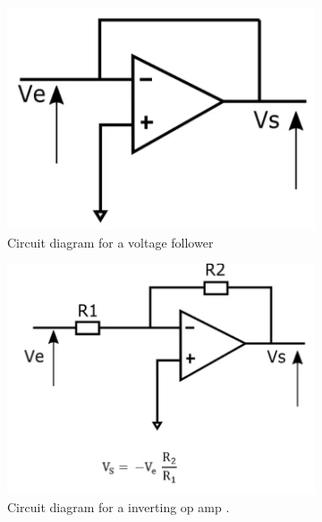 \begin{figure}[H]
\footnotesize
\centering
\begin{subfigure}[]{0.45\textwidth}
\includegraphics[width=\linewidth]{./Figures/Follower.png}
\caption{Circuit diagram for a voltage follower\cite{Fund_Opamps}}
\label{subfig:opamp_foll}	
\end{subfigure}
\begin{subfigure}[]{0.45\textwidth}
\includegraphics[width=\linewidth]{./Figures/Inverting.png}
\caption{Circuit diagram for a inverting op amp \cite{Fund_Opamps}.} 			
\label{subfig:opamp_invert}	
\end{subfigure}
\begin{subfigure}[]{0.45\textwidth}

\end{subfigure}
\end{figure}
